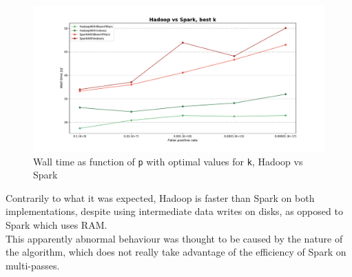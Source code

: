 \begin{figure}[H]
    \begin{center}
        \includegraphics[scale=.45,trim={3cm 0 3cm 0},clip]{img/hadoopSpark_wallTimeP_bestK.pdf}
    \end{center}
    \vspace*{-0.5cm}
    \caption{Wall time as function of \texttt{p} with optimal values for \texttt{k}, Hadoop vs Spark}
    \label{fig:hadoopSpark_wallTimeP_bestK}
\end{figure}

\noindent Contrarily  to what it was expected, Hadoop is faster than Spark on both implementations, despite using intermediate data writes on disks, as opposed to Spark which uses RAM.\\
This apparently abnormal behaviour was thought to be caused by the nature of the algorithm, which does not really take advantage of the efficiency of Spark on multi-passes.